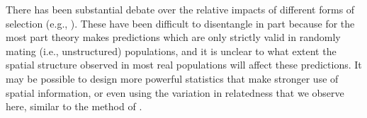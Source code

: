 \documentclass[11pt, oneside]{article}   	%
\newcommand\citet{\cite}
\renewcommand{\revpoint}[2]{\relax}
\begin{document}
There has been substantial debate over the relative impacts of different forms of selection
(e.g., \citet{charlesworth1997effects,charlesworth2012effects,pease2013accurate,hedrick2013adaptive,burri2015linked,corbettdetig2015natural,harris2016genetic,martin2016natural,phung2016determining,stankowski2018tempo}). %
These have been difficult to disentangle in part because for the most part
theory makes predictions which are only strictly valid in randomly mating (i.e., unstructured) populations,
and it is unclear to what extent the spatial structure observed in most real populations will affect these predictions.
It may be possible to design more powerful statistics that make stronger use of spatial information,
or even using the variation in relatedness that we observe here,
similar to the method of \citet{beeravolu2018blockwise}. \revpoint{1}{2}
\end{document}
